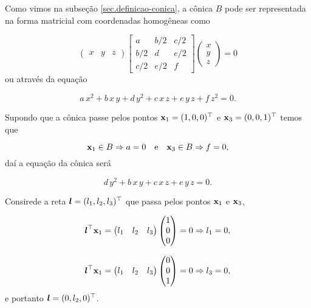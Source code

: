 Como vimos na subseção \ref{sec.definicao-conica}, a cônica $B$ pode ser representada na forma matricial com coordenadas homogêneas como

\begin{equation*}
\begin{pmatrix}
x&y&z
\end{pmatrix}
\begin{bmatrix}
a&b/2&c/2\\
b/2&d&e/2\\
c/2&e/2&f
\end{bmatrix}
\begin{pmatrix}
x\\
y\\
z
\end{pmatrix}
=0
\end{equation*}
ou através da equação

\begin{equation*}
a\,x^2+b\,x\,y+d\,y^2+c\,x\,z+e\,y\,z+f\,z^2=0.
\end{equation*}

Supondo que a cônica passe pelos pontos $\mathbf{x}_1=(1,0,0)^\top$ e $\mathbf{x}_3=(0,0,1)^\top$ temos que

\begin{equation*}
\mathbf{x}_1\in B\Rightarrow a=0\quad\text{e}\quad\mathbf{x}_3\in B\Rightarrow f=0,
\end{equation*}
daí a equação da cônica será 

\begin{equation}\label{eq.reducao-parcial-conica}
d\,y^2+b\,x\,y+c\,x\,z+e\,y\,z=0.
\end{equation}

Consirede a reta $\boldsymbol{l}=(l_1,l_2,l_3)^\top$ que passa pelos pontos $\mathbf{x}_1$ e $\mathbf{x}_3$,

\begin{equation*}
\boldsymbol{l}^\top\mathbf{x}_1=
\begin{pmatrix}
l_1&l_2&l_3
\end{pmatrix}
\begin{pmatrix}
1\\
0\\
0
\end{pmatrix}
=0
\Rightarrow l_1=0,
\end{equation*} 

\begin{equation*}
\boldsymbol{l}^\top\mathbf{x}_1=
\begin{pmatrix}
l_1&l_2&l_3
\end{pmatrix}
\begin{pmatrix}
0\\
0\\
1
\end{pmatrix}
=0
\Rightarrow l_3=0,
\end{equation*} 
e portanto $\boldsymbol{l}=(0,l_2,0)^\top$.


